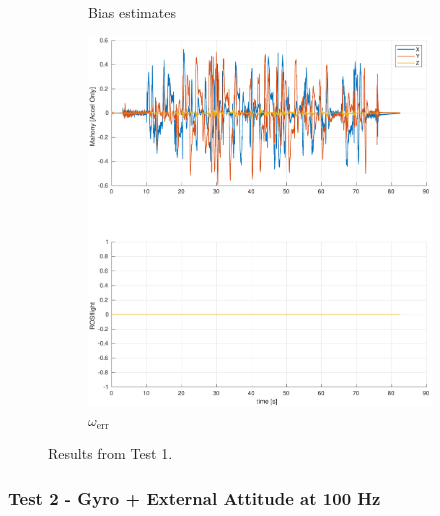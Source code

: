 \documentclass[a4paper]{article}
\begin{document}
\begin{figure}[H]
\begin{subfigure}[t]{0.31\textwidth}
    \caption{Bias estimates}
    \label{fig:scf_est}
  \end{subfigure}\hfill
  \begin{subfigure}[t]{0.31\textwidth}
    \includegraphics[width=\textwidth]{werr_gyroonly.pdf}
    \caption{$\omega_\text{err}$}
    \label{fig:scf_bode}
  \end{subfigure}
  \caption{Results from Test 1.}
  \label{fig:scf}
\end{figure}

\subsubsection*{Test 2 - Gyro + External Attitude at 100 Hz}
\end{document}
